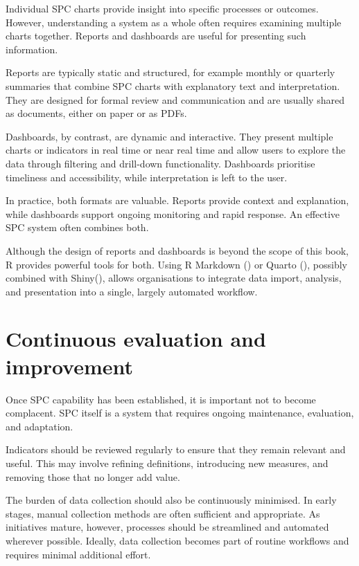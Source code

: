 \documentclass[
]{book}
\begin{document}
Individual SPC charts provide insight into specific processes or
outcomes. However, understanding a system as a whole often requires
examining multiple charts together. Reports and dashboards are useful
for presenting such information.

Reports are typically static and structured, for example monthly or
quarterly summaries that combine SPC charts with explanatory text and
interpretation. They are designed for formal review and communication
and are usually shared as documents, either on paper or as PDFs.

Dashboards, by contrast, are dynamic and interactive. They present
multiple charts or indicators in real time or near real time and allow
users to explore the data through filtering and drill-down
functionality. Dashboards prioritise timeliness and accessibility, while
interpretation is left to the user.

In practice, both formats are valuable. Reports provide context and
explanation, while dashboards support ongoing monitoring and rapid
response. An effective SPC system often combines both.

Although the design of reports and dashboards is beyond the scope of
this book, R provides powerful tools for both. Using R Markdown
() or Quarto
(), possibly combined
with Shiny(), allows
organisations to integrate data import, analysis, and presentation into
a single, largely automated workflow.

\section{Continuous evaluation and
improvement}\label{continuous-evaluation-and-improvement}

Once SPC capability has been established, it is important not to become
complacent. SPC itself is a system that requires ongoing maintenance,
evaluation, and adaptation.

Indicators should be reviewed regularly to ensure that they remain
relevant and useful. This may involve refining definitions, introducing
new measures, and removing those that no longer add value.

The burden of data collection should also be continuously minimised. In
early stages, manual collection methods are often sufficient and
appropriate. As initiatives mature, however, processes should be
streamlined and automated wherever possible. Ideally, data collection
becomes part of routine workflows and requires minimal additional
effort.
\end{document}
